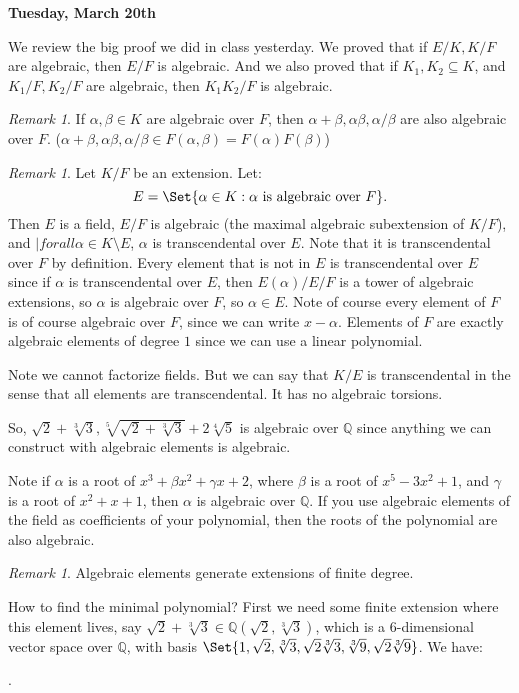 \documentclass[9pt,reqno,twoside]{amsbook}
\theoremstyle{plain}
\numberwithin{section}{chapter}
\numberwithin{equation}{chapter}
\theoremstyle{definition}
\theoremstyle{remark}
\newtheorem{rem}[theorem]{Remark}
\theoremstyle{plain}
\newcommand{\sub}{\subseteq}
\newcommand{\Q}{\mathbb{Q}}
\begin{document}
\textbf{Tuesday, March 20th}

We review the big proof we did in class yesterday. We proved that if $E/K, K/F$ are algebraic, then $E/F$ is algebraic. And we also proved that if $K_1,K_2\sub K$, and $K_1/F,K_2/F$ are algebraic, then $K_1K_2/F$ is algebraic. 

\begin{rem}
If $\alpha,\beta \in K$ are algebraic over $F$, then $\alpha + \beta, \alpha\beta, \alpha/\beta$ are also algebraic over $F$. ($\alpha + \beta, \alpha\beta, \alpha/\beta \in F(\alpha,\beta) = F(\alpha)F(\beta)$)
\end{rem}

\begin{rem}
Let $K/F$ be an extension. Let:
$$
E = \Set{\alpha \in K: \alpha \text{ is algebraic over }F}.
$$
Then $E$ is a field, $E/F$ is algebraic (the maximal algebraic subextension of $K/F$), and $|forall \alpha \in K\setminus E$, $\alpha$ is transcendental over $E$. Note that it is transcendental over $F$ by definition. Every element that is not in $E$ is transcendental over $E$ since if $\alpha$ is transcendental over $E$, then $E(\alpha)/E/F$ is a tower of algebraic extensions, so $\alpha$ is algebraic over $F$, so $\alpha \in E$. Note of course every element of $F$ is of course algebraic over $F$, since we can write $x - \alpha$. Elements of $F$ are exactly algebraic elements of degree $1$ since we can use a linear polynomial. 
\end{rem}

Note we cannot factorize fields. But we can say that $K/E$ is transcendental in the sense that all elements are transcendental. It has no algebraic torsions.

So, $\sqrt{2} + \sqrt[3]{3}, \sqrt[5]{\sqrt{2} + \sqrt[3]{3}} + 2\sqrt[4]{5}$ is algebraic over $\Q$ since anything we can construct with algebraic elements is algebraic. 


Note if $\alpha$ is a root of $x^3 + \beta x^2 + \gamma x + 2$, where $\beta$ is a root of $x^5 - 3x^2 + 1$, and $\gamma$ is a root of $x^2 + x + 1$, then $\alpha$ is algebraic over $\Q$. If you use algebraic elements of the field as coefficients of your polynomial, then the roots of the polynomial are also algebraic. 

\begin{rem}
Algebraic elements generate extensions of finite degree. 
\end{rem}

How to find the minimal polynomial? First we need some finite extension where this element lives, say $\sqrt{2} + \sqrt[3]{3} \in \Q(\sqrt{2},\sqrt[3]{3})$, which is a 6-dimensional vector space over $\Q$, with basis $\Set{1,\sqrt{2},\sqrt[3]{3}, \sqrt{2}\sqrt[3]{3}, \sqrt[3]{9}, \sqrt{2}\sqrt[3]{9}}$. 
We have:
\begin{center}
.
\end{center}
\end{document}
